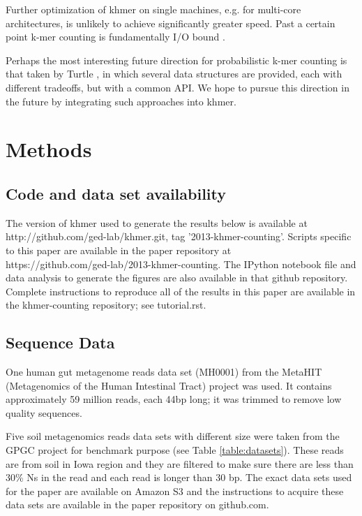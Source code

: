 \documentclass[10pt]{article}
\begin{document}
Further optimization of khmer on single machines, e.g. for multi-core
architectures, is unlikely to achieve significantly greater speed.
Past a certain point k-mer counting is fundamentally I/O bound
\cite{McDonald2013}.

Perhaps the most interesting future direction for probabilistic k-mer
counting is that taken by Turtle \cite{Roy2014}, in which several data
structures are provided, each with different tradeoffs, but with a
common API.  We hope to pursue this direction in the future by
integrating such approaches into khmer.

\section*{Methods}

\subsection*{Code and data set availability}


The version of khmer used to generate the results below is available
at http://github.com/ged-lab/khmer.git, tag '2013-khmer-counting'.
Scripts specific to this paper are available in the paper repository
at \\
https://github.com/ged-lab/2013-khmer-counting.
The IPython\cite{4160251} notebook file and data analysis to generate the figures are also
available in that github repository.  Complete instructions to reproduce
all of the results in this paper are available in the khmer-counting
repository; see tutorial.rst.

\subsection*{Sequence Data}

One human gut metagenome reads data set (MH0001) from the 
MetaHIT (Metagenomics of the Human Intestinal Tract) project \cite{Qin2010} was used. 
It contains approximately 59 million reads, each 44bp long; it was trimmed to remove 
low quality sequences. 

Five soil metagenomics reads data sets with different size were taken
from the GPGC project for benchmark purpose (see Table
\ref{table:datasets}).  These reads are from soil in Iowa region and they
are filtered to make sure there are less than 30\% Ns in the read and
each read is longer than 30 bp.  The exact data sets used for the
paper are available on Amazon S3 and the instructions to acquire these
data sets are available in the paper repository on github.com.
\end{document}
